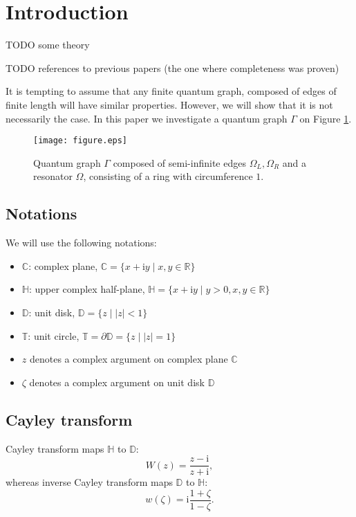 \documentclass{birkjour}
\theoremstyle{definition}
\theoremstyle{remark}
\numberwithin{equation}{section}
\begin{document}
\section{Introduction}

TODO some theory

TODO references to previous papers (the one where completeness was proven)

It is tempting to assume that any finite quantum graph, composed of edges of finite length will have similar properties.
However, we will show that it is not necessarily the case. In this paper we investigate a quantum graph $\Gamma$ on Figure \ref{fig:graph}.

\begin{figure}
\texttt{[image: figure.eps]}
\caption{Quantum graph $\Gamma$ composed of semi-infinite edges $\Omega_L, \Omega_R$ and a resonator $\Omega$, consisting of a ring with circumference $1$.}
\label{fig:graph}
\end{figure}

\subsection{Notations}
We will use the following notations:
\begin{itemize}
\item $\mathbb{C}$: complex plane, $\mathbb{C} = \{ x + \mathrm{i}
y \mid x, y \in \mathbb{R} \}$
\item $\mathbb{H}$: upper complex half-plane, $\mathbb{H} =
\{ x + \mathrm{i} y \mid y > 0, x, y \in \mathbb{R} \}$
\item $\mathbb{D}$: unit disk, $\mathbb{D} = \{ z \mid
\left|z\right| < 1 \}$
\item $\mathbb{T}$: unit circle, $\mathbb{T} = \partial \mathbb{D}
=  \{z \mid \left|z\right| = 1 \}$
\item $z$ denotes a complex argument on complex plane $\mathbb{C}$
\item $\zeta$ denotes a complex argument on unit disk $\mathbb{D}$
\end{itemize}

\subsection{Cayley transform}

Cayley transform maps $\mathbb{H}$ to $\mathbb{D}$:
\[
W(z) = \frac{z - \mathrm{i}}{z + \mathrm{i}},
\]
whereas inverse Cayley transform maps $\mathbb{D}$ to
$\mathbb{H}$:
\begin{equation}\label{eq:cayley_inverse}
w(\zeta) = \mathrm{i} \frac{1 + \zeta}{1 - \zeta}.
\end{equation}
\end{document}
